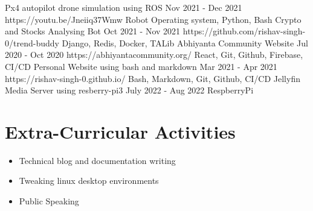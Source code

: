 \documentclass[doublesided, paper=a4, fontsize=10pt]{my-resume}
\begin{document}
{     \project
        {Px4 autopilot drone simulation using ROS}
        {Nov 2021 - Dec 2021}
        {https://youtu.be/Jneiiq37Wmw}
        {Robot Operating system, Python, Bash}
        {
        }
     \project
        {Crypto and Stocks Analysing Bot}
        {Oct 2021 - Nov 2021}
        {https://github.com/rishav-singh-0/trend-buddy}
        {Django, Redis, Docker, TALib}
        {
        }
     \project
        {Abhiyanta Community Website}
        {Jul 2020 - Oct 2020}
        {https://abhiyantacommunity.org/}
        {React, Git, Github, Firebase, CI/CD}
        {
        }
     \project
        {Personal Website using bash and markdown}
        {Mar 2021 - Apr 2021}
        {https://rishav-singh-0.github.io/}
        {Bash, Markdown, Git, Github, CI/CD}
        {
        }
     \project
        {Jellyfin Media Server using resberry-pi3}
        {July 2022 - Aug 2022}
        {}
        {RespberryPi}
        {}
    
    \section[\faPencil]{Extra-Curricular Activities}
     \begin{itemize}
         \item Technical blog and documentation writing
         \item Tweaking linux desktop environments
         \item Public Speaking
     \end{itemize}
    
}
\makebody
\clearpage
\end{document}
